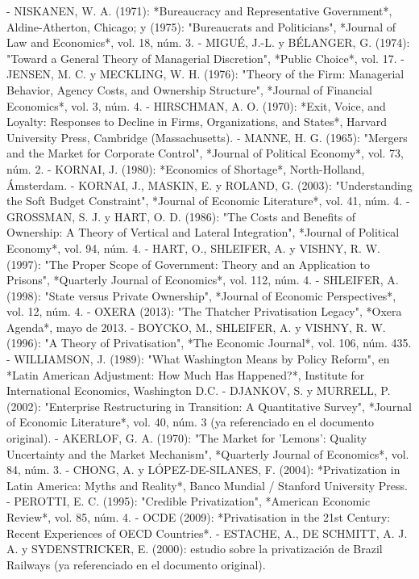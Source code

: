 \documentclass[10pt,a4paper]{article}
\begin{document}
- NISKANEN, W. A. (1971): *Bureaucracy and Representative Government*, Aldine-Atherton, Chicago; y (1975): "Bureaucrats and Politicians", *Journal of Law and Economics*, vol. 18, núm. 3.
- MIGUÉ, J.-L. y BÉLANGER, G. (1974): "Toward a General Theory of Managerial Discretion", *Public Choice*, vol. 17.
- JENSEN, M. C. y MECKLING, W. H. (1976): "Theory of the Firm: Managerial Behavior, Agency Costs, and Ownership Structure", *Journal of Financial Economics*, vol. 3, núm. 4.
- HIRSCHMAN, A. O. (1970): *Exit, Voice, and Loyalty: Responses to Decline in Firms, Organizations, and States*, Harvard University Press, Cambridge (Massachusetts).
- MANNE, H. G. (1965): "Mergers and the Market for Corporate Control", *Journal of Political Economy*, vol. 73, núm. 2.
- KORNAI, J. (1980): *Economics of Shortage*, North-Holland, Ámsterdam.
- KORNAI, J., MASKIN, E. y ROLAND, G. (2003): "Understanding the Soft Budget Constraint", *Journal of Economic Literature*, vol. 41, núm. 4.
- GROSSMAN, S. J. y HART, O. D. (1986): "The Costs and Benefits of Ownership: A Theory of Vertical and Lateral Integration", *Journal of Political Economy*, vol. 94, núm. 4.
- HART, O., SHLEIFER, A. y VISHNY, R. W. (1997): "The Proper Scope of Government: Theory and an Application to Prisons", *Quarterly Journal of Economics*, vol. 112, núm. 4.
- SHLEIFER, A. (1998): "State versus Private Ownership", *Journal of Economic Perspectives*, vol. 12, núm. 4.
- OXERA (2013): "The Thatcher Privatisation Legacy", *Oxera Agenda*, mayo de 2013.
- BOYCKO, M., SHLEIFER, A. y VISHNY, R. W. (1996): "A Theory of Privatisation", *The Economic Journal*, vol. 106, núm. 435.
- WILLIAMSON, J. (1989): "What Washington Means by Policy Reform", en *Latin American Adjustment: How Much Has Happened?*, Institute for International Economics, Washington D.C.
- DJANKOV, S. y MURRELL, P. (2002): "Enterprise Restructuring in Transition: A Quantitative Survey", *Journal of Economic Literature*, vol. 40, núm. 3 (ya referenciado en el documento original).
- AKERLOF, G. A. (1970): "The Market for 'Lemons': Quality Uncertainty and the Market Mechanism", *Quarterly Journal of Economics*, vol. 84, núm. 3.
- CHONG, A. y LÓPEZ-DE-SILANES, F. (2004): *Privatization in Latin America: Myths and Reality*, Banco Mundial / Stanford University Press.
- PEROTTI, E. C. (1995): "Credible Privatization", *American Economic Review*, vol. 85, núm. 4.
- OCDE (2009): *Privatisation in the 21st Century: Recent Experiences of OECD Countries*.
- ESTACHE, A., DE SCHMITT, A. J. A. y SYDENSTRICKER, E. (2000): estudio sobre la privatización de Brazil Railways (ya referenciado en el documento original).
\end{document}
